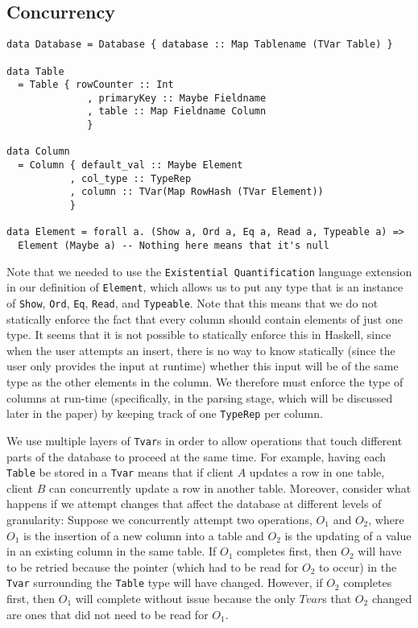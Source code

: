 \documentclass[10pt]{article}
\begin{document}
\begin{multicols}{2}
\subsection{Concurrency} 
\noindent\begin{minipage}{.45\textwidth}
\begin{lstlisting}[caption=The data structures used to build up a table.,frame=tlrb, breaklines=true]
data Database = Database { database :: Map Tablename (TVar Table) }

data Table 
  = Table { rowCounter :: Int 
              , primaryKey :: Maybe Fieldname 
              , table :: Map Fieldname Column
              }

data Column 
  = Column { default_val :: Maybe Element
           , col_type :: TypeRep
           , column :: TVar(Map RowHash (TVar Element))
           } 

data Element = forall a. (Show a, Ord a, Eq a, Read a, Typeable a) => 
  Element (Maybe a) -- Nothing here means that it's null
\end{lstlisting}
\end{minipage}\hfill

Note that we needed to use the \texttt{Existential Quantification} language extension in our definition of \texttt{Element}, which allows us to put any type that is an instance of \texttt{Show}, \texttt{Ord}, \texttt{Eq}, \texttt{Read}, and \texttt{Typeable}.  Note that this means that we do not statically enforce the fact that every column should contain elements of just one type. It seems that it is not possible to statically enforce this in Haskell, since when the user attempts an insert, there is no way to know statically (since the user only provides the input at runtime) whether this input will be of the same type as the other elements in the column. We therefore must enforce the type of columns at run-time (specifically, in the parsing stage, which will be discussed later in the paper) by keeping track of one \texttt{TypeRep} per column. 

We use multiple layers of \texttt{Tvar}s in order to allow operations that touch different parts of the database to proceed at the same time. For example, having each \texttt{Table} be stored in a \texttt{Tvar} means that if client $A$ updates a row in one table, client $B$ can concurrently update a row in another table. Moreover, consider what happens if we attempt changes that affect the database at different levels of granularity: Suppose we concurrently attempt two operations, $O_1$ and $O_2$, where $O_1$ is the insertion of a new column into a table and $O_2$ is the updating of a value in an existing column in the same table. If $O_1$ completes first, then $O_2$ will have to be retried because the pointer (which had to be read for $O_2$ to occur) in the \texttt{Tvar} surrounding the \texttt{Table} type will have changed. However, if $O_2$ completes first, then $O_1$ will complete without issue because the only $Tvar$s that $O_2$ changed are ones that did not need to be read for $O_1$. 



\end{multicols}
\end{document}
